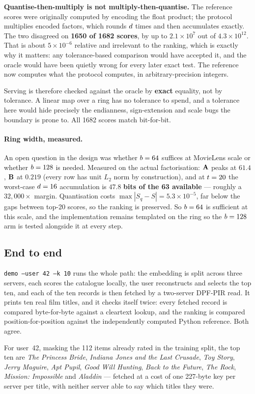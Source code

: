 \textbf{Quantise-then-multiply is not multiply-then-quantise.} The reference
scores were originally computed by encoding the float product; the protocol
multiplies encoded factors, which rounds $d$ times and then accumulates
exactly. The two disagreed on \textbf{1650 of 1682 scores}, by up to
$2.1 \times 10^{7}$ out of $4.3 \times 10^{12}$. That is about $5\times10^{-6}$
relative and irrelevant to the ranking, which is exactly why it matters: any
tolerance-based comparison would have accepted it, and the oracle would have
been quietly wrong for every later exact test. The reference now computes what
the protocol computes, in arbitrary-precision integers.

Serving is therefore checked against the oracle by \textbf{exact} equality, not
by tolerance. A linear map over a ring has no tolerance to spend, and a
tolerance here would hide precisely the endianness, sign-extension and
scale bugs the boundary is prone to. All 1682 scores match bit-for-bit.

\paragraph{Ring width, measured.} An open question in the design was whether
$b = 64$ suffices at MovieLens scale or whether $b = 128$ is needed.
Measured on the actual factorisation: $\mathbf{A}$ peaks at $61.4$,
$\mathbf{B}$ at $0.219$ (every row has unit $L_2$ norm by construction), and at
$t = 20$ the worst-case $d = 16$ accumulation is
$\mathbf{47.8}$ \textbf{bits of the 63 available} --- roughly a $32{,}000\times$
margin. Quantisation costs $\max|S_q - S| = 5.3 \times 10^{-5}$, far below the
gaps between top-20 scores, so the ranking is preserved. So $b = 64$ is
sufficient at this scale, and the implementation remains templated on the ring
so the $b = 128$ arm is tested alongside it at every step.

\subsection{End to end}
\label{sec:tech:pir:demo}

\texttt{demo --user 42 --k 10} runs the whole path: the embedding is split
across three servers, each scores the catalogue locally, the user reconstructs
and selects the top ten, and each of the ten records is then fetched by a
two-server DPF-PIR read. It prints ten real film titles, and it checks itself
twice: every fetched record is compared byte-for-byte against a cleartext
lookup, and the ranking is compared position-for-position against the
independently computed Python reference. Both agree.

For user~42, masking the 112 items already rated in the training split, the top
ten are \emph{The Princess Bride}, \emph{Indiana Jones and the Last Crusade},
\emph{Toy Story}, \emph{Jerry Maguire}, \emph{Apt Pupil}, \emph{Good Will
Hunting}, \emph{Back to the Future}, \emph{The Rock}, \emph{Mission:
Impossible} and \emph{Aladdin} --- fetched at a cost of one 227-byte key per
server per title, with neither server able to say which titles they were.
